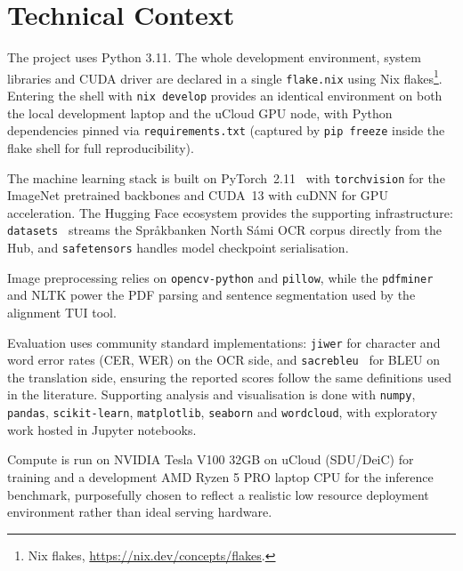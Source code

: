 \section{Technical Context}
\label{sec:technical-context}

The project uses Python 3.11. The whole development environment, system libraries and CUDA driver are declared in a single \texttt{flake.nix} using Nix flakes\footnote{Nix flakes, \url{https://nix.dev/concepts/flakes}.}.
Entering the shell with \texttt{nix develop} provides an identical environment on both the local development laptop and the uCloud GPU node, with Python dependencies pinned via \texttt{requirements.txt} (captured by \texttt{pip freeze} inside the flake shell for full reproducibility).

The machine learning stack is built on PyTorch~2.11~\cite{paszke2019pytorch} with \texttt{torchvision} for the ImageNet pretrained backbones and CUDA~13 with cuDNN for GPU acceleration. 
The Hugging Face ecosystem provides the supporting infrastructure: \texttt{datasets}~\cite{lhoest2021datasets} streams the Spr\r{a}kbanken North S\'{a}mi OCR corpus directly from the Hub, and \texttt{safetensors} handles model checkpoint serialisation.

Image preprocessing relies on \texttt{opencv-python} and \texttt{pillow}, while the \texttt{pdfminer} and NLTK power the PDF parsing and sentence segmentation used by the alignment TUI tool.

Evaluation uses community standard implementations: \texttt{jiwer} for character and word error rates (CER, WER) on the OCR side, and \texttt{sacrebleu}~\cite{post2018call} for BLEU on the translation side, ensuring the reported scores follow the same definitions used in the literature. Supporting analysis and visualisation is done with \texttt{numpy}, \texttt{pandas}, \texttt{scikit-learn}, \texttt{matplotlib}, \texttt{seaborn} and \texttt{wordcloud}, with exploratory work hosted in Jupyter notebooks.

Compute is run on NVIDIA Tesla V100 32GB on uCloud (SDU/DeiC) for training and a development AMD Ryzen 5 PRO laptop CPU for the inference benchmark, purposefully chosen to reflect a realistic low resource deployment environment rather than ideal serving hardware.


